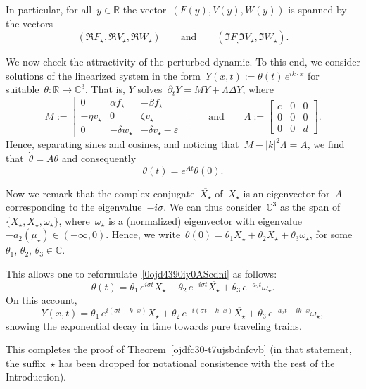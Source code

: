 \documentclass[12pt]{amsart}
\newcommand{\R}{\mathbb{R}}
\newcommand{\C}{\mathbb{C}}
\renewcommand{\epsilon}{\varepsilon}
\numberwithin{equation}{section}
\begin{document}
In particular, for all~$y\in\R$ the vector~$(F(y),V(y),W(y))$ is spanned by the vectors
$$( \Re F_\star,\Re V_\star,\Re W_\star)\qquad{\mbox{and}}\qquad( \Im F_,\Im V_\star,\Im W_\star).$$

We now check the attractivity of the perturbed dynamic. To this end, we consider
solutions of the linearized system in the form~$Y(x,t):=\theta(t)\,e^{ik\cdot x}$ for suitable~$\theta:\R\to\C^3$. That is, $Y$ solves~$\partial_t Y=MY+\Lambda\Delta Y$, where
$$M:=\begin{bmatrix}
0 & \alpha f_\star & -\beta f_\star\\
-\eta v_\star &0&\zeta v_\star\\
0&-\delta w_\star &-\delta v_\star -\epsilon
\end{bmatrix}\qquad{\mbox{and}}\qquad
\Lambda:=\begin{bmatrix}c&0&0\\0&0&0\\0&0&d\end{bmatrix}.$$
Hence, separating sines and cosines, and noticing that~$M-|k|^2\Lambda=A$,
we find that~$\dot \theta=A\theta$
and consequently\begin{equation}\label{0ojd4390iy0AScdni}\theta(t)=e^{At} \theta(0).\end{equation}

Now we remark that the complex conjugate~$\overline{X_\star}$ of~$X_\star$ is an eigenvector for~$A$ corresponding to the eigenvalue~$-i\sigma$.
We can thus consider~$\C^3$ as the span of~$\{ X_\star, \overline{X_\star}, \omega_\star\}$, where~$\omega_\star$
is a (normalized) eigenvector with eigenvalue~$-a_2(\mu_\star)\in(-\infty,0)$.
Hence, we write~$\theta(0)=
\theta_1 X_\star+\theta_2 \overline{X_\star}+\theta_3 \omega_\star$, for some~$\theta_1$, $\theta_2$, $\theta_3\in\C$.

This allows one to reformulate~\eqref{0ojd4390iy0AScdni} as follows:
$$ \theta(t)=\theta_1\,e^{i\sigma t}X_\star+\theta_2\,e^{-i\sigma t}\overline{X_\star}+\theta_3\,e^{-a_2 t}\omega_\star
.$$
On this account, $$Y(x,t)=\theta_1\,e^{i(\sigma t+k\cdot x)}X_\star+\theta_2\,e^{-i(\sigma t-k\cdot x)} \overline{X_\star}+\theta_3\,e^{-a_2 t+ik\cdot x}\omega_\star,$$
showing the exponential decay in time towards pure traveling trains.

This completes the proof of Theorem~\ref{ojdfc30-t7ujsbdnfcvb}
(in that statement, the suffix~$\star$ has been dropped for notational consistence
with the rest of the Introduction).
\end{document}

